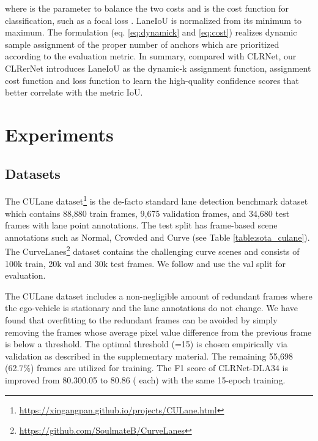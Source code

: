 \documentclass[10pt,twocolumn,letterpaper]{article}
\begin{document}
where  is the parameter to balance the two costs and  is the cost function for classification, such as a focal loss \cite{focalloss}. LaneIoU is normalized from its minimum to maximum.
The formulation (eq. \ref{eq:dynamick} and \ref{eq:cost}) realizes dynamic sample assignment of the proper number of anchors which are prioritized according to the evaluation metric. 
In summary, compared with CLRNet, our CLRerNet introduces LaneIoU as the dynamic-k assignment function, assignment cost function and loss function to learn the high-quality confidence scores that better correlate with the metric IoU.

\section{Experiments}
\subsection{Datasets}\label{subsec:datasets}

The CULane dataset\footnote{\url{https://xingangpan.github.io/projects/CULane.html}}\cite {pan2018SCNN} is the de-facto standard lane detection benchmark dataset which contains 88,880 train frames, 9,675 validation frames, and 34,680 test frames with lane point annotations. The test split has frame-based scene annotations such as Normal, Crowded and Curve (see Table \ref{table:sota_culane}). 
The CurveLanes\footnote{\url{https://github.com/SoulmateB/CurveLanes}} \cite{CurveLane-NAS} dataset contains the challenging curve scenes and consists of 100k train, 20k val and 30k test frames. We follow \cite{Liu_2021_ICCV} and use the val split for evaluation.

 The CULane dataset includes a non-negligible amount of redundant frames where the ego-vehicle is stationary and the lane annotations do not change. We have found that overfitting to the redundant frames can be avoided by simply removing the frames whose average pixel value difference from the previous frame is below a threshold. The optimal threshold (=15) is chosen empirically via validation as described in the supplementary material. The remaining 55,698 (62.7\%) frames are utilized for training. The F1 score of CLRNet-DLA34 is improved from 80.300.05 to 80.86 ( each) with the same 15-epoch training.
\end{document}
